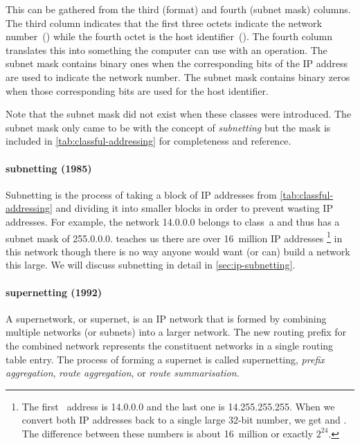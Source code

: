 This can be gathered from the third (format) and fourth (subnet mask) columns.
The third column indicates that the first three octets indicate the network number~() while the fourth octet is the host identifier~().
The fourth column translates this into something the computer can use with an  operation.
The subnet mask contains binary ones when the corresponding bits of the \acs{IP} address are used to indicate the network number.
The subnet mask contains binary zeros when those corresponding bits are used for the host identifier.

Note that the subnet mask did not exist when these classes were introduced.
The subnet mask only came to be with the concept of \emph{subnetting} but the mask is included in \cref{tab:classful-addressing} for completeness and reference.

\paragraph{subnetting (1985)}
Subnetting is the process of taking a block of \acs{IP} addresses from \vref{tab:classful-addressing} and dividing it into smaller blocks in order to prevent wasting \acs{IP} addresses.
For example, the network 14.0.0.0 belongs to class~a and thus has a subnet mask of 255.0.0.0.
 teaches us there are over 16~million \acs{IP} addresses%
   \footnote{%
      The first \IP\ address is 14.0.0.0 and the last one is 14.255.255.255.
      When we convert both \acs{IP} addresses back to a single large 32-bit number, we get  and .
      The difference between these numbers is about 16~million or exactly $2^24$.
   }
in this network though there is no way anyone would want (or can) build a network this large.
We will discuss subnetting in detail in \vref{sec:ip-subnetting}.

\paragraph{supernetting (1992)}
A supernetwork, or supernet, is an \acs{IP} network that is formed by combining multiple networks (or subnets) into a larger network.
The new routing prefix for the combined network represents the constituent networks in a single routing table entry.
The process of forming a supernet is called supernetting, \emph{prefix aggregation}, \emph{route aggregation}, or \emph{route summarisation}.

